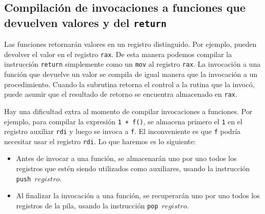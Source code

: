 \documentclass{article}
\begin{document}
\subsection{Compilaci\'on de invocaciones a funciones que devuelven valores y del \texttt{return}}

Las funciones retornar\'an valores en un registro distinguido.
Por ejemplo, pueden devolver el valor en el registro \texttt{rax}.
De esta manera podemos compilar la instrucci\'on \texttt{return}
simplemente como un \texttt{mov} al registro \texttt{rax}.
La invocaci\'on a una funci\'on que devuelve un valor se compila
de igual manera que 
la invocaci\'on a un procedimiento.
Cuando la subrutina retorna el control a la rutina que la invoc\'o,
puede asumir que el resultado de retorno se encuentra almacenado en
\texttt{rax}.

Hay una dificultad extra al momento de compilar invocaciones a
funciones. Por ejemplo,
para compilar la expresi\'on \texttt{1 + f()},
se almacena primero el \texttt{1} en el registro auxiliar \texttt{rdi}
y luego se invoca a \texttt{f}. El inconveniente es que \texttt{f}
podr\'ia necesitar usar el registro \texttt{rdi}.
Lo que haremos es lo siguiente:
\begin{itemize}
\item Antes de invocar a una funci\'on,
      se almacenar\'an uno por uno todos
      los registros que est\'en siendo utilizados como auxiliares,
      usando la instrucci\'on \texttt{push $registro$}.
\item Al finalizar la invocaci\'on a una funci\'on,
      se recuperar\'an uno por uno todos
      los registros de la pila,
      usando la instrucci\'on \texttt{pop $registro$}.
\end{itemize}
\end{document}
